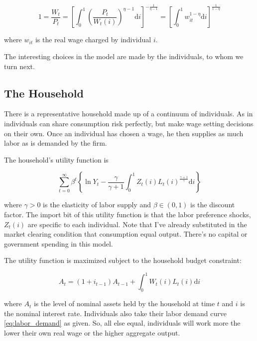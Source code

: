 \documentclass[12pt,a4paper]{scrartcl}            %
\begin{document}
\begin{equation} \label{eq:real_wage}
    1 = \frac{W_t}{P_t} = \left[\int_{0}^{1} \left( \frac{P_t}{W_t(i)} \right)^{\eta - 1} \mathrm{d}i \right]^{-\frac{1}{\eta - 1} } = \left[\int_{0}^{1} \! w_{it}^{1 - \eta} \mathrm{d}i \right]^{ \frac{1}{1 - \eta} }
\end{equation}

where $w_{it}$ is the real wage charged by individual $i$.

The interesting choices in the model are made by the individuals, to whom we turn next.

\subsection{The Household}
\label{sub:The Household}

There is a representative household made up of a continuum of individuals.
As in \cite{erceg_henderson_levin_1999} individuals can share consumption risk perfectly, but make wage setting decisions on their own.
Once an individual has chosen a wage, he then supplies as much labor as is demanded by the firm.

The household's utility function is

\begin{equation} \label{eq:utility}
    \sum_{t=0}^{\infty} \beta^t \left\{\ln Y_t - \frac{\gamma}{\gamma + 1} \int_{0}^{1} Z_t(i)L_t(i)^{\frac{\gamma + 1}{\gamma}}\mathrm{d}i\right\}
\end{equation}

where $\gamma > 0$ is the elasticity of labor supply and $\beta \in (0, 1)$ is the discount factor.
The import bit of this utility function is that the labor preference shocks, $Z_t(i)$ are specific to each individual.
Note that I've already substituted in the market clearing condition that consumption equal output.
There's no capital or government spending in this model.

The utility function is maximized subject to the household budget constraint:

\begin{equation}
    \label{eq:budget}
    A_t = \left(1 + i_{t-1}\right)A_{t-1} + \int_{0}^{1} W_t(i)L_t(i)\mathrm{d}i
\end{equation}

where $A_t$ is the level of nominal assets held by the household at time $t$ and $i$ is the nominal interest rate.
Individuals also take their labor demand curve \ref{eq:labor_demand} as given.
So, all else equal, individuals will work more the lower their own real wage or the higher aggregate output.
\end{document}
